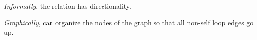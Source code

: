 
{\it Informally}, the relation has directionality.

{\it Graphically}, can organize the nodes of the graph so that 
all non-self loop edges go up.